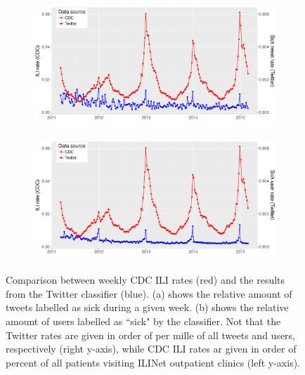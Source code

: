 \documentclass[11pt, a4paper,twoside]{report}\usepackage[]{graphicx}\usepackage[]{color}
\begin{document}
\begin{figure}[H]
\centering
  \begin{subfigure}[t]{1\textwidth}
  \includegraphics[width=1\linewidth]{24_cdc_twitter_comp_nat_raw.pdf}
  \caption{}
  \end{subfigure}
\hfill
  \begin{subfigure}[t]{1\textwidth}
  \includegraphics[width=1\linewidth]{25_cdc_twitter_comp_nat_raw_user.pdf}
  \caption{}
  \end{subfigure}
  \caption{Comparison between weekly CDC ILI rates (red) and the results from the Twitter classifier (blue). (a) shows the relative amount of tweets labelled as sick during a given week. (b) shows the relative amount of users labelled as ``sick" by the classifier. Not that the Twitter rates are given in order of per mille of all tweets and users, respectively (right y-axis), while CDC ILI rates ar given in order of percent of all patients visiting ILINet outpatient clinics (left y-axis).}
  \label{fig:naive_comparison_CDC_twitter}
\end{figure}
\end{document}
